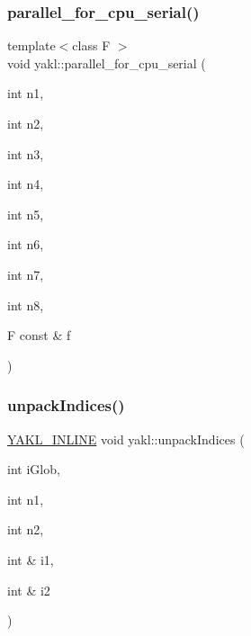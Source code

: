 \mbox{\label{namespaceyakl_a9e5308eeaac62f3347a095109c023360}} 
\subsubsection{\texorpdfstring{parallel\+\_\+for\+\_\+cpu\+\_\+serial()}{parallel\_for\_cpu\_serial()}\hspace{0.1cm}{\footnotesize\ttfamily [8/8]}}
{\footnotesize\ttfamily template$<$class F $>$ \\
void yakl\+::parallel\+\_\+for\+\_\+cpu\+\_\+serial (\begin{DoxyParamCaption}\item[{int}]{n1,  }\item[{int}]{n2,  }\item[{int}]{n3,  }\item[{int}]{n4,  }\item[{int}]{n5,  }\item[{int}]{n6,  }\item[{int}]{n7,  }\item[{int}]{n8,  }\item[{F const \&}]{f }\end{DoxyParamCaption})\hspace{0.3cm}{\ttfamily [inline]}}

\mbox{\label{namespaceyakl_ae5d52efb6b604b973e2459a72db868e7}} 
\subsubsection{\texorpdfstring{unpack\+Indices()}{unpackIndices()}\hspace{0.1cm}{\footnotesize\ttfamily [1/7]}}
{\footnotesize\ttfamily \hyperlink{YAKL_8h_aa0dd629ffce6d564b19e9313fb91a5ad}{Y\+A\+K\+L\+\_\+\+I\+N\+L\+I\+NE} void yakl\+::unpack\+Indices (\begin{DoxyParamCaption}\item[{int}]{i\+Glob,  }\item[{int}]{n1,  }\item[{int}]{n2,  }\item[{int \&}]{i1,  }\item[{int \&}]{i2 }\end{DoxyParamCaption})}

